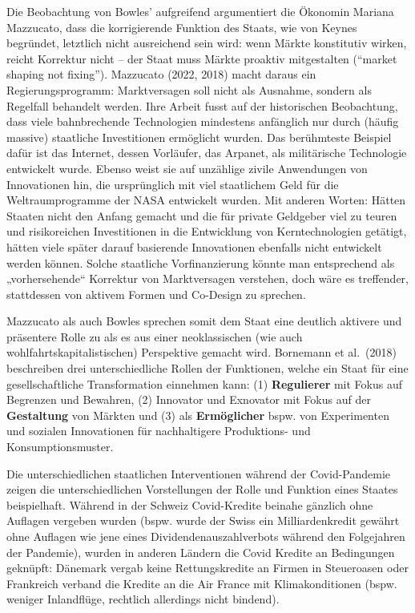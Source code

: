 \documentclass[
  nswissgerman,
  a4paper,
  DIV=11,
  numbers=noendperiod,
  oneside,
  openany]{scrreprt}
\begin{document}
Die Beobachtung von Bowles' aufgreifend argumentiert die Ökonomin
Mariana Mazzucato, dass die korrigierende Funktion des Staats, wie von
Keynes begründet, letztlich nicht ausreichend sein wird: wenn Märkte
konstitutiv wirken, reicht Korrektur nicht -- der Staat muss Märkte
proaktiv mitgestalten (``market shaping not fixing''). Mazzucato (2022,
2018) macht daraus ein Regierungsprogramm: Marktversagen soll nicht als
Ausnahme, sondern als Regelfall behandelt werden. Ihre Arbeit fusst auf
der historischen Beobachtung, dass viele bahnbrechende Technologien
mindestens anfänglich nur durch (häufig massive) staatliche
Investitionen ermöglicht wurden. Das berühmteste Beispiel dafür ist das
Internet, dessen Vorläufer, das Arpanet, als militärische Technologie
entwickelt wurde. Ebenso weist sie auf unzählige zivile Anwendungen von
Innovationen hin, die ursprünglich mit viel staatlichem Geld für die
Weltraumprogramme der NASA entwickelt wurden. Mit anderen Worten: Hätten
Staaten nicht den Anfang gemacht und die für private Geldgeber viel zu
teuren und risikoreichen Investitionen in die Entwicklung von
Kerntechnologien getätigt, hätten viele später darauf basierende
Innovationen ebenfalls nicht entwickelt werden können. Solche staatliche
Vorfinanzierung könnte man entsprechend als „vorhersehende`` Korrektur
von Marktversagen verstehen, doch wäre es treffender, stattdessen von
aktivem Formen und Co-Design zu sprechen.

Mazzucato als auch Bowles sprechen somit dem Staat eine deutlich
aktivere und präsentere Rolle zu als es aus einer neoklassischen (wie
auch wohlfahrtskapitalistischen) Perspektive gemacht wird. Bornemann et
al.~(2018) beschreiben drei unterschiedliche Rollen der Funktionen,
welche ein Staat für eine gesellschaftliche Transformation einnehmen
kann: (1) \textbf{Regulierer} mit Fokus auf Begrenzen und Bewahren, (2)
Innovator und Exnovator mit Fokus auf der \textbf{Gestaltung} von
Märkten und (3) als \textbf{Ermöglicher} bspw. von Experimenten und
sozialen Innovationen für nachhaltigere Produktions- und
Konsumptionsmuster.

Die unterschiedlichen staatlichen Interventionen während der
Covid-Pandemie zeigen die unterschiedlichen Vorstellungen der Rolle und
Funktion eines Staates beispielhaft. Während in der Schweiz
Covid-Kredite beinahe gänzlich ohne Auflagen vergeben wurden (bspw.
wurde der Swiss ein Milliardenkredit gewährt ohne Auflagen wie jene
eines Dividendenauszahlverbots während den Folgejahren der Pandemie),
wurden in anderen Ländern die Covid Kredite an Bedingungen geknüpft:
Dänemark vergab keine Rettungskredite an Firmen in Steueroasen oder
Frankreich verband die Kredite an die Air France mit Klimakonditionen
(bspw. weniger Inlandflüge, rechtlich allerdings nicht bindend).
\end{document}
